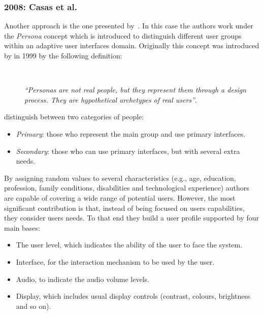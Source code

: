 
\subsubsection{2008: Casas et al.}
\label{sec:casas}

Another approach is the one presented by~\citet{casas_user_2008}. In this case 
the authors work under the \textit{Persona} concept which is introduced to 
distinguish different user groups within an adaptive user interfaces domain. 
Originally this concept was introduced by \citeauthor{cooper_inmates_2004} in 
1999 by the following definition:

\newpage

\begin{description}
  \item[] \hfill \\
  \begin{mdframed}[hidealllines=true,backgroundcolor=gray!20]
  \textit{``Personas are not real people, but they represent them through a design 
  process. They are hypothetical archetypes of real users''}. 
  \end{mdframed}
\end{description}

\citeauthor{casas_user_2008} distinguish between two categories of people:

\begin{itemize}
 \item \textit{Primary}: those who represent the main group and use primary 
 interfaces. 
 \item \textit{Secondary}: those who can use primary interfaces, but with 
 several extra needs.
\end{itemize}

By assigning random values to several characteristics (e.g., age, education,
profession, family conditions, disabilities and technological experience) 
authors are capable of covering a wide range of potential users. However, the 
most significant contribution is that, instead of being focused on users 
capabilities, they consider users needs. To that end they build a user 
profile supported by four main bases: 

\begin{itemize}
 \item The user level, which indicates the ability of the user to face the 
 system.
 \item Interface, for the interaction mechanism to be used by the user.
 \item Audio, to indicate the audio volume levels.
 \item Display, which includes usual display controls (contrast, colours, 
 brightness and so on).
\end{itemize}

